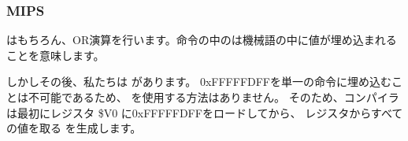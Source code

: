 ﻿\subsubsection{MIPS}




はもちろん、OR演算を行います。命令の中のは機械語の中に値が埋め込まれることを意味します。


しかしその後、私たちは \AND があります。 0xFFFFFDFFを単一の命令に埋め込むことは不可能であるため、 を使用する方法はありません。
そのため、コンパイラは最初にレジスタ \$V0 に0xFFFFFDFFをロードしてから、
レジスタからすべての値を取る \AND を生成します。
